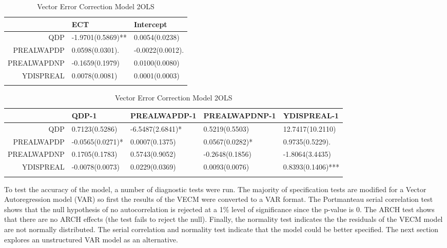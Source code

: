 \documentclass[11pt,preprint, authoryear]{elsarticle}
\numberwithin{equation}{section}
\numberwithin{figure}{section}
\numberwithin{table}{section}
\begin{document}
\begin{longtable}{rll}
  \hline
 & ECT & Intercept \\ 
  \hline
QDP & -1.9701(0.5869)**  & 0.0054(0.0238)     \\ 
  PREALWAPDP & 0.0598(0.0301).   & -0.0022(0.0012).   \\ 
  PREALWAPDNP & -0.1659(0.1979)     & 0.0100(0.0080)     \\ 
  YDISPREAL & 0.0078(0.0081)     & 0.0001(0.0003)     \\ 
   \hline
\hline
\caption{Vector Error Correction Model 2OLS\label{vecm1}} 
\end{longtable}
\begin{longtable}{rllll}
  \hline
 & QDP-1 & PREALWAPDP-1 & PREALWAPDNP-1 & YDISPREAL-1 \\ 
  \hline
QDP & 0.7123(0.5286)     & -6.5487(2.6841)*   & 0.5219(0.5503)     & 12.7417(10.2110)     \\ 
  PREALWAPDP & -0.0565(0.0271)*   & 0.0007(0.1375)     & 0.0567(0.0282)*   & 0.9735(0.5229).   \\ 
  PREALWAPDNP & 0.1705(0.1783)     & 0.5743(0.9052)     & -0.2648(0.1856)     & -1.8064(3.4435)     \\ 
  YDISPREAL & -0.0078(0.0073)     & 0.0229(0.0369)     & 0.0093(0.0076)     & 0.8393(0.1406)*** \\ 
   \hline
\hline
\caption{Vector Error Correction Model 2OLS\label{vecm11}} 
\end{longtable}

To test the accuracy of the model, a number of diagnostic tests were
run. The majority of specification tests are modified for a Vector
Autoregression model (VAR) so first the results of the VECM were
converted to a VAR format. The Portmanteau serial correlation test shows
that the null hypothesis of no autocorrelation is rejected at a 1\%
level of significance since the p-value is 0. The ARCH test shows that
there are no ARCH effects (the test fails to reject the null). Finally,
the normality test indicates the the residuals of the VECM model are not
normally distributed. The serial correlation and normality test indicate
that the model could be better specified. The next section explores an
unstructured VAR model as an alternative.
\end{document}
